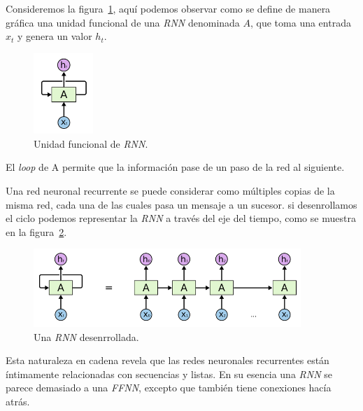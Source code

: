 \documentclass[a4paper,12pt]{article}
\begin{document}
Consideremos la figura~\ref{fig:rnnunit}, aquí podemos observar como se define de manera gráfica una unidad funcional de una \textit{RNN} denominada $A$, que toma una entrada $x_t$ y genera un valor $h_t$.

\begin{figure}[H]
	\begin{center}				
		\includegraphics[width=0.2\textwidth]{tesis_27.png}
		\caption{Unidad funcional de \textit{RNN}. \citep{olahlstm}}
		\label{fig:rnnunit}
	\end{center}
\end{figure}

El \textit{loop} de A permite que la información pase de un paso de la red al siguiente.

Una red neuronal recurrente se puede considerar como múltiples copias de la misma red, cada una de las cuales pasa un mensaje a un sucesor. si desenrollamos el ciclo podemos representar la \textit{RNN} a través del eje del tiempo, como se muestra en la  figura~\ref{fig:rnnunrolled}.

\begin{figure}[H]
	\begin{center}
		\includegraphics[width=0.9\textwidth]{tesis_28.png}
		\caption{Una \textit{RNN} desenrrollada. \citep{olahlstm}}
		\label{fig:rnnunrolled}
	\end{center}
\end{figure}

Esta naturaleza en cadena revela que las redes neuronales recurrentes están íntimamente relacionadas con secuencias y listas. En su esencia una \textit{RNN} se parece demasiado a una \textit{FFNN}, excepto que también tiene conexiones hacía atrás.

\clearpage
\end{document}
